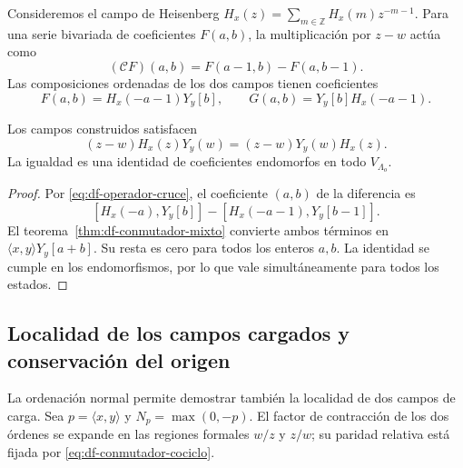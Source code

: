 
Consideremos el campo de Heisenberg
\(H_x(z)=\sum_{m\in\mathbb Z}H_x(m)z^{-m-1}\).
Para una serie bivariada de coeficientes \(F(a,b)\), la multiplicación
por \(z-w\) actúa como
\begin{equation}
 (\mathcal C F)(a,b)=F(a-1,b)-F(a,b-1).
 \label{eq:df-operador-cruce}
\end{equation}
Las composiciones ordenadas de los dos campos tienen coeficientes
\[
 F(a,b)=H_x(-a-1)Y_y[b],\qquad
 G(a,b)=Y_y[b]H_x(-a-1).
\]

\begin{theorem}
\label{thm:df-localidad-mixta}
Los campos construidos satisfacen
\begin{equation}
 (z-w)H_x(z)Y_y(w)=(z-w)Y_y(w)H_x(z).
 \label{eq:df-localidad-mixta}
\end{equation}
La igualdad es una identidad de coeficientes endomorfos en todo
\(V_{\Lambda_o}\).
\end{theorem}

\begin{proof}
Por \eqref{eq:df-operador-cruce}, el coeficiente \((a,b)\) de la
diferencia es
\[
 [H_x(-a),Y_y[b]]-[H_x(-a-1),Y_y[b-1]].
\]
El teorema~\ref{thm:df-conmutador-mixto} convierte ambos términos en
\(\langle x,y\rangle Y_y[a+b]\). Su resta es cero para todos los
enteros \(a,b\). La identidad se cumple en los endomorfismos, por lo
que vale simultáneamente para todos los estados.
\end{proof}

\subsection{Localidad de los campos cargados y conservación del origen}
\label{subsec:df-localidad-cargada}


La ordenación normal permite demostrar también la localidad de dos
campos de carga. Sea \(p=\langle x,y\rangle\) y
\(N_p=\max(0,-p)\). El factor de contracción de los dos órdenes se
expande en las regiones formales \(w/z\) y \(z/w\); su paridad relativa
está fijada por \eqref{eq:df-conmutador-cociclo}.

